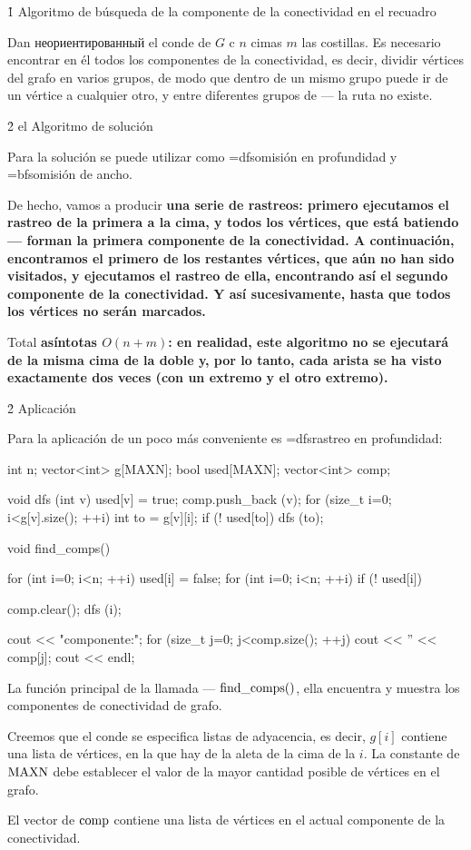 \h1{ Algoritmo de búsqueda de la componente de la conectividad en el recuadro }

Dan неориентированный el conde de $G$ c $n$ cimas $m$ las costillas. Es necesario encontrar en él todos los componentes de la conectividad, es decir, dividir vértices del grafo en varios grupos, de modo que dentro de un mismo grupo puede ir de un vértice a cualquier otro, y entre diferentes grupos de --- la ruta no existe.


\h2{ el Algoritmo de solución }

Para la solución se puede utilizar como \algohref=dfs{omisión en profundidad} y \algohref=bfs{omisión de ancho}.

De hecho, vamos a producir \bf{una serie de rastreos}: primero ejecutamos el rastreo de la primera a la cima, y todos los vértices, que está batiendo --- forman la primera componente de la conectividad. A continuación, encontramos el primero de los restantes vértices, que aún no han sido visitados, y ejecutamos el rastreo de ella, encontrando así el segundo componente de la conectividad. Y así sucesivamente, hasta que todos los vértices no serán marcados.

Total \bf{asíntotas} $O(n + m)$: en realidad, este algoritmo no se ejecutará de la misma cima de la doble y, por lo tanto, cada arista se ha visto exactamente dos veces (con un extremo y el otro extremo).


\h2{ Aplicación }

Para la aplicación de un poco más conveniente es \algohref=dfs{rastreo en profundidad}:

\code
int n;
vector<int> g[MAXN];
bool used[MAXN];
vector<int> comp;

void dfs (int v) {
used[v] = true;
comp.push_back (v);
for (size_t i=0; i<g[v].size(); ++i) {
int to = g[v][i];
if (! used[to])
dfs (to);
}
}

void find_comps() {
for (int i=0; i<n; ++i)
used[i] = false;
for (int i=0; i<n; ++i)
if (! used[i]) {
comp.clear();
dfs (i);

cout << "componente:";
for (size_t j=0; j<comp.size(); ++j)
cout << '' << comp[j];
cout << endl;
}
}
\endcode

La función principal de la llamada --- $\rm find\_comps()$, ella encuentra y muestra los componentes de conectividad de grafo.

Creemos que el conde se especifica listas de adyacencia, es decir, $g[i]$ contiene una lista de vértices, en la que hay de la aleta de la cima de la $i$. La constante de $\rm MAXN$ debe establecer el valor de la mayor cantidad posible de vértices en el grafo.

El vector de $\rm comp$ contiene una lista de vértices en el actual componente de la conectividad.